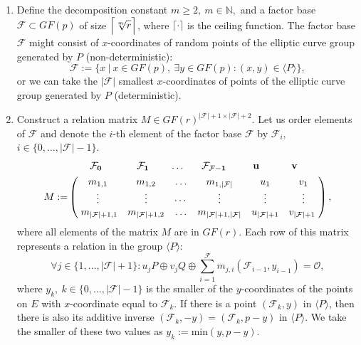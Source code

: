\documentclass[thesis=M,english]{FITthesis}[2012/10/20]
\theoremstyle{remark}
\theoremstyle{definition}
\begin{document}
\begin{enumerate}
\item Define the decomposition constant $m \geq 2,\ m \in \mathbb{N},$ and a factor base $\mathcal{F} \subset GF(p)$ of size $\mathlarger{\Big\lceil \sqrt[m]{r} \Big\rceil}$, where $\lceil \cdot \rceil$ is the ceiling function. The factor base $\mathcal{F}$ might consist of $x$-coordinates of random points of the elliptic curve group generated by $P$ (non-deterministic):
$$
\mathcal{F} := \Big\{x\ \Big|\ x \in GF(p),\ \exists y \in GF(p): (x,y) \in \langle P \rangle  \Big\},
$$
or we can take the $|\mathcal{F}|$ smallest $x$-coordinates of points of the elliptic curve group generated by $P$ (deterministic).
\item Construct a relation matrix $M \in GF(r)^{|\mathcal{F}| + 1 \times |\mathcal{F}| + 2}$. Let us order elements of $\mathcal{F}$ and denote the $i$-th element of the factor base $\mathcal{F}$ by $\mathcal{F}_i,$ ${i \in \{0,\ldots,|\mathcal{F}| - 1\}}$.
\begin{align*}
&\begin{matrix}
\hphantom{........}\mathbf{\mathcal{F}_0} & \hphantom{.........} \mathbf{\mathcal{F}_1} & \hphantom{....}\ldots &\hphantom{...} \mathbf{\mathcal{F}_{\mathcal{F} - 1}} & \hphantom{......}\mathbf{u} & \hphantom{........} \mathbf{v}
\end{matrix}\\
M := &\begin{pmatrix}
m_{1,1} & m_{1,2} & \ldots & m_{1,|\mathcal{F}|} & u_1 & v_1 \\
\vdots & \vdots & \cdots & \vdots & \vdots  & \vdots  \\
\hphantom{.}m_{|\mathcal{F}| + 1,1} & m_{|\mathcal{F}| + 1,2} & \ldots & m_{|\mathcal{F}| + 1,|\mathcal{F}|} & u_{|\mathcal{F}| + 1} & v_{|\mathcal{F}| + 1} \hphantom{.}
\end{pmatrix},
\end{align*}
where all elements of the matrix $M$ are in $GF(r)$. Each row of this matrix represents a relation in the group $\langle P \rangle$:
$$
\forall j \in \{1,\ldots,|\mathcal{F}| + 1\}: u_jP \oplus v_jQ \oplus \sum_{i=1}^{\mathcal{F}} m_{j,i} (\mathcal{F}_{i-1}, y_{i-1}) = \mathcal{O}, 
$$
where $y_k,\ k \in \{0,\ldots,|\mathcal{F}| - 1\}$ is the smaller of the $y$-coordinates of the points on $E$ with $x$-coordinate equal to $\mathcal{F}_k$. If there is a point $(\mathcal{F}_k, y)$ in $\langle P \rangle$, then there is also its additive inverse $(\mathcal{F}_k,-y) = (\mathcal{F}_k, p - y)$ in $\langle P \rangle$. We take the smaller of these two values as $y_k := \text{min}(y, p - y)$.  \\ \\

\end{enumerate}
\end{document}

